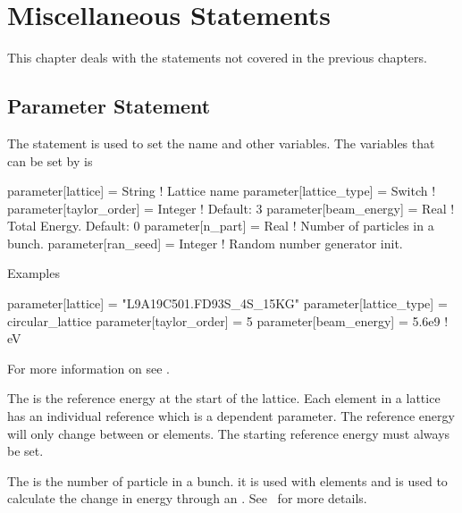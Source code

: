 \chapter{Miscellaneous Statements}

This chapter deals with the statements not covered in the previous chapters.

\section{Parameter Statement}
\label{s:param}


The  statement is used to set the  name and other variables. 
The variables that can be set by  is
\begin{example}
  parameter[lattice]      = String      ! Lattice name 
  parameter[lattice_type] = Switch      ! 
  parameter[taylor_order] = Integer     ! Default: 3
  parameter[beam_energy]  = Real        ! Total Energy. Default: 0
  parameter[n_part]       = Real        ! Number of particles in a bunch.
  parameter[ran_seed]     = Integer     ! Random number generator init.
\end{example}

\noindent
Examples
\begin{example}
  parameter[lattice]      = "L9A19C501.FD93S_4S_15KG"
  parameter[lattice_type] = circular_lattice
  parameter[taylor_order] = 5
  parameter[beam_energy]  = 5.6e9    ! eV
\end{example}

For more information on  see .

The  is the reference energy at the start of the
lattice.  Each element in a lattice has an individual reference
 which is a dependent parameter. 
The reference energy will only change between  or
 elements. The starting reference energy must always be set.

The  is the number of particle in a bunch.
it is used with  elements and is used to calculate the
change in energy through an . See~ for more
details.

